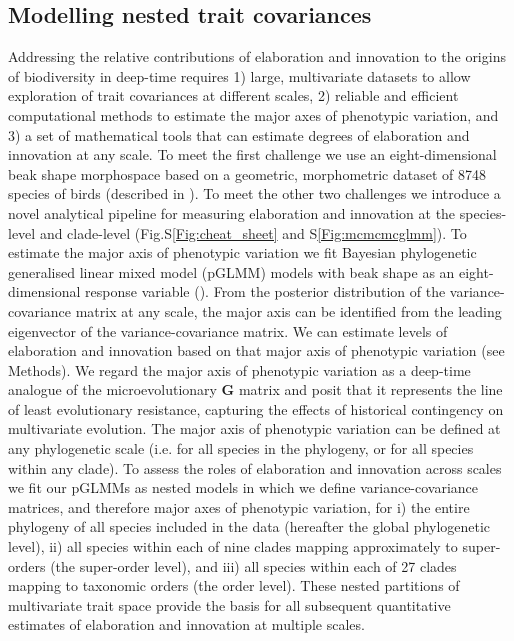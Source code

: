 \documentclass[12pt,letterpaper]{article}
\begin{document}
\subsection{Modelling nested trait covariances}
Addressing the relative contributions of elaboration and innovation to the origins of biodiversity in deep-time requires
1) large, multivariate datasets to allow exploration of trait covariances at different scales,
2) reliable and efficient computational methods to estimate the major axes of phenotypic variation,
and 3) a set of mathematical tools that can estimate degrees of elaboration and innovation at any scale.
To meet the first challenge we use an eight-dimensional beak shape morphospace based on a geometric, morphometric dataset of 8748 species of birds (described in \cite{hughes2022global}).
To meet the other two challenges we introduce a novel analytical pipeline for measuring elaboration and innovation at the species-level and clade-level (Fig.S\ref{Fig:cheat_sheet} and S\ref{Fig:mcmcmcglmm}).
To estimate the major axis of phenotypic variation we fit Bayesian phylogenetic generalised linear mixed model (pGLMM) models with beak shape as an eight-dimensional response variable (\cite{MCMCglmm}).
From the posterior distribution of the variance-covariance matrix at any scale, the major axis can be identified from the leading eigenvector of the variance-covariance matrix.
We can estimate levels of elaboration and innovation based on that major axis of phenotypic variation (see Methods).
We regard the major axis of phenotypic variation as a deep-time analogue of the microevolutionary \textbf{G} matrix \cite{robinson2013quantifying} and posit that it represents the line of least evolutionary resistance, capturing the effects of historical contingency on multivariate evolution.
The major axis of phenotypic variation can be defined at any phylogenetic scale (i.e. for all species in the phylogeny, or for all species within any clade).
To assess the roles of elaboration and innovation across scales we fit our pGLMMs as nested models in which we define variance-covariance matrices, and therefore major axes of phenotypic variation, for
i) the entire phylogeny of all species included in the data (hereafter the global phylogenetic level),
ii) all species within each of nine clades mapping approximately to super-orders (the super-order level),
and iii) all species within each of 27 clades mapping to taxonomic orders (the order level).
These nested partitions of multivariate trait space provide the basis for all subsequent quantitative estimates of elaboration and innovation at multiple scales.
\end{document}
